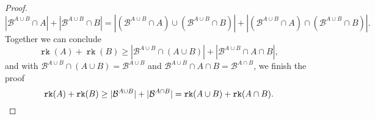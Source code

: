 \documentclass[12pt,a4paper, twoside, autooneside=false]{scrartcl}
\theoremstyle{definition}
\theoremstyle{remark}
\numberwithin{equation}{section}
\DeclareMathOperator{\rk}{\mathtt{rk}}
\newcommand{\M}{\mathcal{M}} %
\begin{document}
\begin{proof}
\[
|\mathcal{B}^{A \cup B} \cap A| + |\mathcal{B}^{A \cup B} \cap B| = |(\mathcal{B}^{A \cup B} \cap A) \cup (\mathcal{B}^{A \cup B} \cap B)| + |(\mathcal{B}^{A \cup B} \cap A) \cap (\mathcal{B}^{A \cup B} \cap B)|.
\]
Together we can conclude 
\[
\rk(A) + \rk(B) \geq |\mathcal{B}^{A \cup B} \cap (A \cup B)| + |\mathcal{B}^{A \cup B} \cap A \cap B|,
\] 
and with $\mathcal{B}^{A \cup B} \cap (A \cup B) = \mathcal{B}^{A \cup B}$ and $\mathcal{B}^{A \cup B } \cap A \cap B = \mathcal{B}^{A \cap B}$, we finish the proof
\[
\rk(A) + \rk(B) \geq |\mathcal{B}^{A \cup B}| + |\mathcal{B}^{A \cap B}| = \rk(A \cup B) + \rk(A \cap B). \qedhere
\] 

\end{proof}
\end{document}
